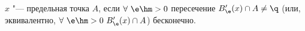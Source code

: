 
$x$ "--- предельная точка $A$, если $\forall\ \e\hm>0$ пересечение $B'_\e(x)\cap A\neq \q$ (или, эквивалентно, $\forall\  \e\hm>0\ B'_\e(x)\cap A$) бесконечно.
 
